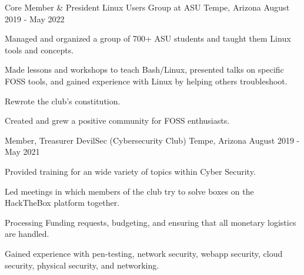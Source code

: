 

\begin{cventries}

  \cventry
    {Core Member \& President} %
    {Linux Users Group at ASU} %
    {Tempe, Arizona} %
    {August 2019 - May 2022} %
    {
      \begin{cvitems} %
        \item {Managed and organized a group of 700+ ASU students and taught them Linux tools and concepts.}
        \item {Made lessons and workshops to teach Bash/Linux, presented talks on specific FOSS tools, and gained experience with Linux by helping others troubleshoot.}
        \item {Rewrote the club's constitution.}
        \item {Created and grew a positive community for FOSS enthusiasts.}
      \end{cvitems}
    }

  \cventry
    {Member, Treasurer} %
    {DevilSec (Cybersecurity Club)} %
    {Tempe, Arizona} %
    {August 2019 - May 2021} %
    {
      \begin{cvitems} %
        \item {Provided training for an wide variety of topics within Cyber Security.}
        \item {Led meetings in which members of the club try to solve boxes on the HackTheBox platform together.}
        \item {Processing Funding requests, budgeting, and ensuring that all monetary logistics are handled.}
        \item {Gained experience with pen-testing, network security, webapp security, cloud security, physical security, and networking.}
      \end{cvitems}
    }

\end{cventries}

